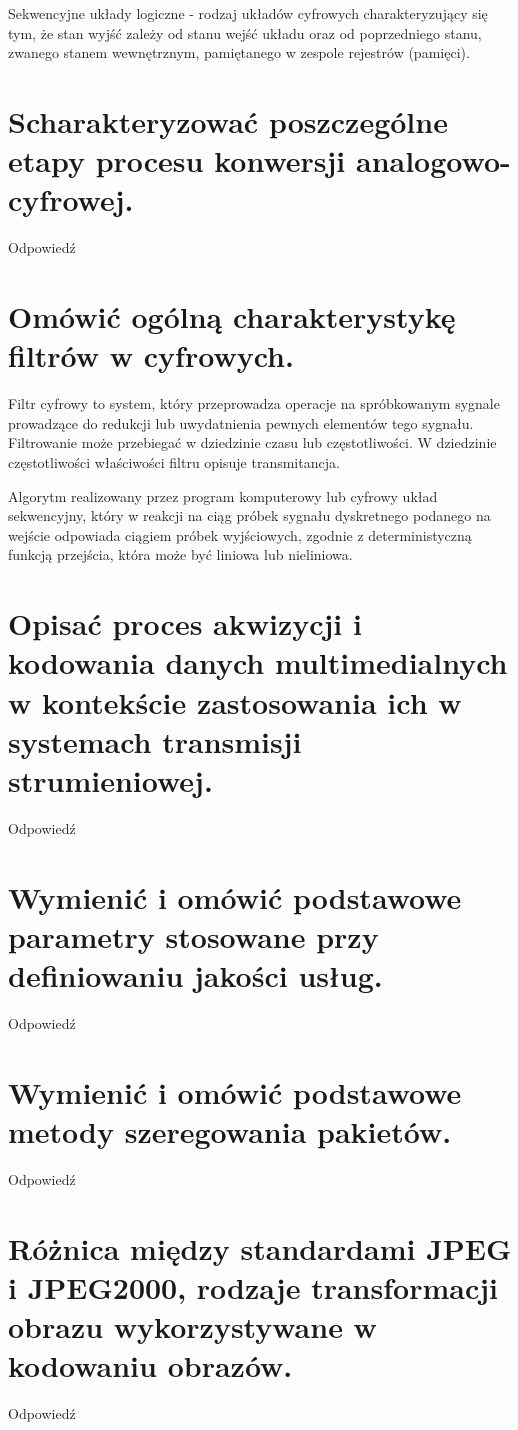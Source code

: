 \documentclass[12pt,a4paper]{article}
\begin{document}
	Sekwencyjne układy logiczne - rodzaj układów cyfrowych charakteryzujący się tym, że stan wyjść zależy od stanu wejść układu oraz od poprzedniego stanu, zwanego stanem wewnętrznym, pamiętanego w zespole rejestrów (pamięci).

	\section{Scharakteryzować poszczególne etapy procesu konwersji analogowo-cyfrowej.}
	Odpowiedź

	\section{Omówić ogólną charakterystykę filtrów w cyfrowych.}
	Filtr cyfrowy to system, który przeprowadza operacje na spróbkowanym sygnale prowadzące do redukcji lub uwydatnienia pewnych elementów tego sygnału. Filtrowanie może przebiegać w dziedzinie czasu lub częstotliwości. W dziedzinie częstotliwości właściwości filtru opisuje transmitancja.

	Algorytm realizowany przez program komputerowy lub cyfrowy układ sekwencyjny, który w reakcji na ciąg próbek sygnału dyskretnego podanego na wejście odpowiada ciągiem próbek wyjściowych, zgodnie z deterministyczną funkcją przejścia, która może być liniowa lub nieliniowa.


	\section{Opisać proces akwizycji i kodowania danych multimedialnych w kontekście zastosowania ich w systemach transmisji strumieniowej.}
	Odpowiedź

	\section{Wymienić i omówić podstawowe parametry stosowane przy definiowaniu jakości usług.}
	Odpowiedź

	\section{Wymienić i omówić podstawowe metody szeregowania pakietów.}
	Odpowiedź

	\section{Różnica między standardami JPEG i JPEG2000, rodzaje transformacji obrazu wykorzystywane w kodowaniu obrazów.}
	Odpowiedź
\end{document}
